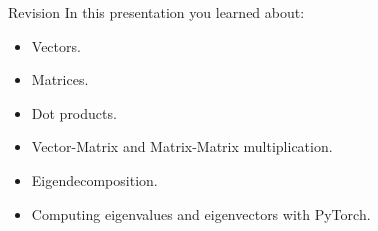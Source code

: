 \documentclass{beamer}
\begin{document}
\begin{frame}{Revision}
In this presentation you learned about:
    \begin{itemize}
        \item Vectors.
        \item Matrices.
        \item Dot products.
        \item Vector-Matrix and Matrix-Matrix multiplication.
        \item Eigendecomposition.
        \item Computing eigenvalues and eigenvectors with PyTorch.
    \end{itemize}

\end{frame}
\end{document}
